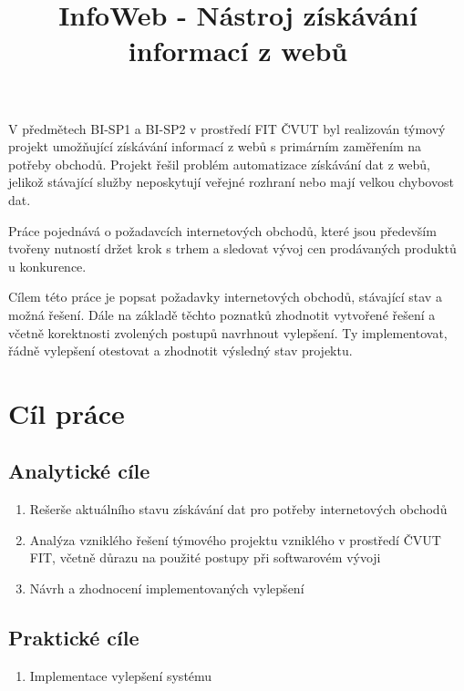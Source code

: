 \documentclass[thesis=B,czech]{FITthesis}[2012/06/26]
\title{ InfoWeb - Nástroj získávání informací z webů }
\begin{document}

\begin{introduction}
V předmětech BI-SP1 a BI-SP2 v prostředí FIT ČVUT byl realizován týmový projekt umožňující získávání informací z webů s primárním zaměřením na potřeby obchodů. Projekt řešil problém automatizace získávání dat z webů, jelikož stávající služby neposkytují veřejné rozhraní
nebo mají velkou chybovost dat.
\par
Práce pojednává o požadavcích internetových obchodů, které jsou především tvořeny nutností držet krok s trhem a sledovat vývoj cen
prodávaných produktů u konkurence.
\par
Cílem této práce je popsat požadavky internetových obchodů, stávající stav a možná řešení. Dále na základě těchto poznatků
zhodnotit vytvořené řešení a včetně korektnosti zvolených postupů navrhnout vylepšení. Ty implementovat, řádně vylepšení
otestovat a zhodnotit výsledný stav projektu.


\newpage

\newpage

\end{introduction}

\chapter{Cíl práce}

\section{Analytické cíle}

\begin{enumerate}  
\item Rešerše aktuálního stavu získávání dat pro potřeby
internetových obchodů
\item Analýza vzniklého řešení týmového projektu vzniklého v prostředí ČVUT FIT,
včetně důrazu na použité postupy při softwarovém vývoji
\item Návrh a zhodnocení implementovaných vylepšení
\end{enumerate}

\section{Praktické cíle}
\begin{enumerate}  
\item Implementace vylepšení systému
\end{enumerate}
\end{document}
